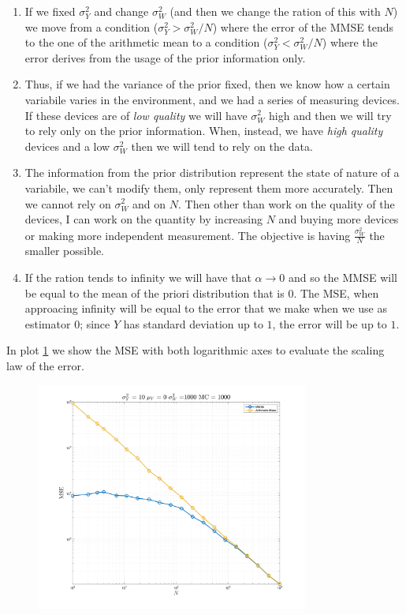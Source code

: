 \begin{enumerate}
    \item If we fixed $\sigma^2_Y$ and change $\sigma_W^2$ (and then we change the ration of this with $N$) we move from a condition ($\sigma_Y^2>\sigma^2_W/N$) where the error of the MMSE tends to the one of the arithmetic mean to a condition ($\sigma_Y^2<\sigma^2_W/N$) where the error derives from the usage of the prior information only.
    \item Thus, if we had the variance of the prior fixed, then we know how a certain variabile varies in the environment, and we had a series of measuring devices. If these devices are of \textit{low quality} we will have $\sigma_W^2$ high and then we will try to rely only on the prior information. When, instead, we have \textit{high quality} devices and a low $\sigma^2_W$ then we will tend to rely on the data.
    \item The information from the prior distribution represent the state of nature of a variabile, we can't modify them, only represent them more accurately. Then we cannot rely on $\sigma^2_W$ and on $N$. Then other than work on the quality of the devices, I can work on the quantity by increasing $N$ and buying more devices or making more independent measurement. The objective is having $\frac{\sigma^2_W}{N}$ the smaller possible.
    \item If the ration tends to infinity we will have that $\alpha \to 0$ and so the MMSE will be equal to the mean of the priori distribution that is $0$. The MSE, when approacing infinity will be equal to the error that we make when we use as estimator $0$; since $Y$ has standard deviation up to $1$, the error will be up to $1$.
\end{enumerate}

In plot \ref{fig:figure_23} we show the MSE with both logarithmic axes to evaluate the scaling law of the error.

\begin{figure}[H]
    \centering
    \includegraphics[width=0.8\textwidth]{./figures/appendix_a/figure_23.png}
    \label{fig:figure_23}
\end{figure}

